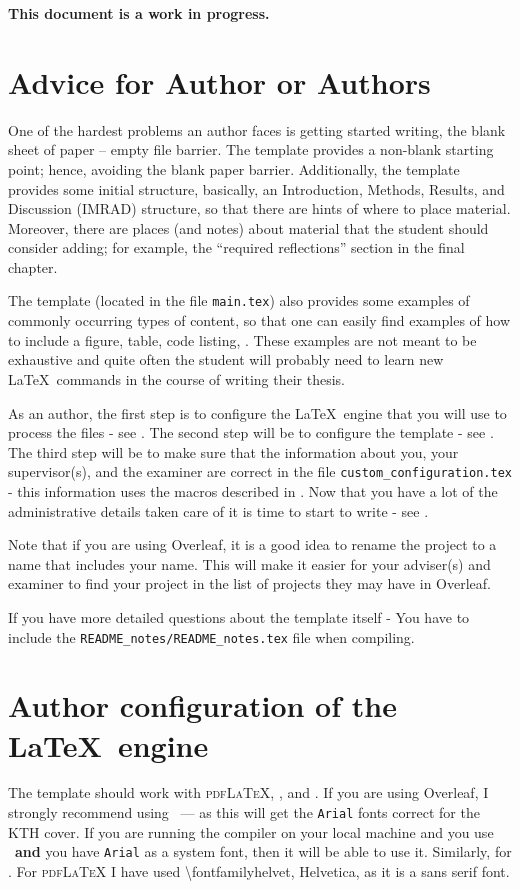 \documentclass[main.tex]{subfiles}
\begin{document}
\noindent\textbf{This document is a work in progress.}


\section{Advice for Author or Authors}
\label{sec:authors}
One of the hardest problems an author faces is getting started writing, \ie the blank sheet of paper -- empty file barrier. The template provides a \mbox{non-blank} starting point; hence, avoiding the blank paper barrier. Additionally, the template provides some initial structure, basically, an Introduction, Methods, Results, and Discussion (IMRAD) structure, so that there are hints of where to place material. Moreover, there are places (and notes) about material that the student should consider adding; for example, the ``required reflections'' section in the final chapter.

The template (located in the file \texttt{main.tex}) also provides some examples of commonly occurring types of content, so that one can easily find examples of how to include a figure, table, code listing, \etc. These examples are not meant to be exhaustive and quite often the student will probably need to learn new \LaTeX\  commands in the course of writing their thesis.

As an author, the first step is to configure the \LaTeX\  engine that you will use to process the files - see . The second step will be to configure the template - see . The third step will be to make sure that the information about you, your supervisor(s), and the examiner are correct in the file \texttt{custom\_configuration.tex} - this information uses the macros described in . Now that you have a lot of the administrative details taken care of it is time to start to write - see .

Note that if you are using Overleaf, it is a good idea to rename the project to a name that includes your name. This will make it easier for your adviser(s) and examiner to find your project in the list of projects they may have in Overleaf.


If you have more detailed questions about the template itself - 
{You have to include the \texttt{README\_notes/README\_notes.tex} file when compiling.}

\section{Author configuration of the \LaTeX\  engine}
\label{sec:latexEngine}
The template should work with \textsc{pdfLaTeX}, \XeLaTeX, and \LuaLaTeX.  If you are using Overleaf, I strongly recommend using \XeLaTeX\ ---  as this will get the \texttt{Arial} fonts correct for the KTH cover. If you are running the compiler on your local machine and you use \XeLaTeX\  \textbf{and} you have \texttt{Arial} as a system font, then it will be able to use it. Similarly, for \LuaLaTeX. For \textsc{pdfLaTeX} I have used \textbackslash fontfamily{helvet}, \ie Helvetica, as it is a sans serif font.
\end{document}
